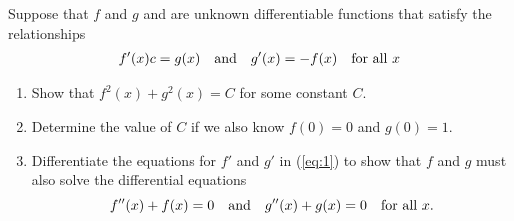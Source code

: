 \documentclass[12pt,letterpaper]{hmcpset}
\begin{document}
\begin{problem}[6]
  Suppose that $f$ and $g$ and are unknown differentiable functions that satisfy the relationships
  \begin{align}{2} \label{eq:1}
    f'(x) c= g(x) \text{\quad and\quad} g'(x) = -f(x) \text{\quad for all } x
  \end{align}
  \begin{enumerate}[label=(\alph*)]
  \item Show that $f^2(x) + g^2(x) = C$ for some constant $C$.
  \item Determine the value of $C$ if we also know $f(0) = 0$ and $g(0) = 1$.
  \item Differentiate the equations for $f'$ and $g'$ in (\ref{eq:1}) to show that $f$ and $g$ must also solve the differential equations
    \[ f''(x) + f(x) = 0 \text{\quad and\quad} g''(x) + g(x) = 0 \text{\quad for all } x. \]
  \end{enumerate}
\end{problem}
\begin{solution}

\end{solution}
\end{document}
